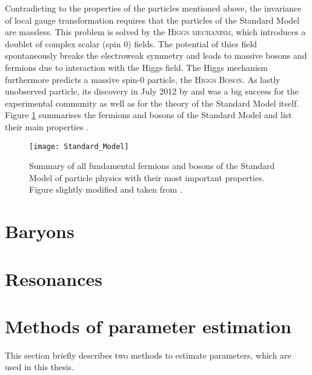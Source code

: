 Contradicting to the properties of the particles mentioned above, the invariance of local gauge transformation requires that the particles of the Standard Model are massless.
This problem is solved by the \textsc{Higgs mechanism}, which introduces a doublet of complex scalar (spin 0) fields.
The potential of thies field spontaneously breaks the electroweak symmetry and leads to massive bosons and fermions due to interaction with the Higgs field.
The Higgs mechanism furthermore predicts a massive spin-0 particle, the \textsc{Higgs Boson}.
As lastly unobserved particle, its discovery in July 2012 by \atlas \cite{Higgs_ATLAS} and \cms \cite{Higgs_CMS} was a big success for the experimental community as well as for the theory of the Standard Model itself. 
Figure \ref{fig:SM} summarises the fermions and bosons of the Standard Model and list their main properties \cite{Perkins_HEP, Burgess_SM, Meissner}.
\begin{figure}[ptb]
    \centering
	\texttt{[image: Standard\_Model]}	
	\caption{Summary of all fundamental fermions and bosons of the Standard Model of particle physics with their most important properties. Figure slightly modified and taken from \cite{SM_figure}.}
	\label{fig:SM}
\end{figure}

\section{Baryons}

\section{Resonances}

\section{Methods of parameter estimation}
This section briefly describes two methods to estimate parameters, which are used in this thesis.

